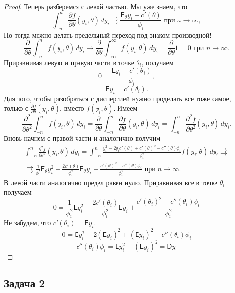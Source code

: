 \begin{proof}
  Теперь разберемся с левой частью. Мы уже знаем, что
  $$
    \int_{-n}^n\frac{\partial f}{\partial\theta}(y_i,\theta)\,dy_i \rightrightarrows \frac{\mathsf{E}_\theta y_i - c'(\theta)}{\phi_i} \text{ при } n\to\infty,
  $$
  Но тогда можно делать предельный переход под знаком производной!
  $$
    \frac{\partial}{\partial\theta} \int_{-n}^n f(y_i, \theta)\,dy_i \to \frac{\partial}{\partial\theta} \int_{-\infty}^\infty f(y_i, \theta)\,dy_i = \frac{\partial}{\partial\theta} 1 = 0 \text{ при } n\to\infty.
  $$
  Приравнивая левую и правую части в точке $\theta_i$, получаем
  $$
    0 = \frac{\mathsf{E}y_i - c'(\theta_i)}{\phi_i},
  $$
  $$
    \mathsf{E}y_i = c'(\theta_i).
  $$
  Для того, чтобы разобраться с дисперсией нужно проделать все тоже самое, только с $\frac{\partial f}{\partial\theta}(y_i, \theta)$, вместо $f(y_i, \theta)$. Имеем
  $$
    \frac{\partial^2}{\partial\theta^2} \int_{-n}^n f(y_i, \theta)\,dy_i =
    \frac{\partial}{\partial\theta} \int_{-n}^n\frac{\partial f}{\partial\theta}(y_i,\theta)\,dy_i = \int_{-n}^n\frac{\partial^2 f}{\partial\theta^2}(y_i,\theta)\,dy_i.
  $$
  Вновь начнем с правой части и аналогично получим
  \begin{multline*}
    \int_{-n}^n\frac{\partial^2 f}{\partial\theta^2}(y_i,\theta)\,dy_i =
    \int_{-n}^n \frac{y_i^2 - 2y_ic'(\theta) + c'(\theta)^2 - c''(\theta)\phi_i}{\phi_i^2} f(y_i,\theta)\,dy_i \rightrightarrows\\
    \rightrightarrows
    \frac{1}{\phi_i^2}\mathsf{E}_\theta y_i^2 -
    \frac{2c'(\theta)}{\phi_i^2}\mathsf{E}_\theta y_i +
    \frac{c'(\theta)^2 - c''(\theta)\phi_i}{\phi_i^2} \text{ при } n\to\infty.
  \end{multline*}
  В левой части аналогично предел равен нулю. Приравнивая все в точке $\theta_i$ получаем
  $$
    0 = \frac{1}{\phi_i^2}\mathsf{E} y_i^2 -
    \frac{2c'(\theta_i)}{\phi_i^2}\mathsf{E} y_i +
    \frac{c'(\theta_i)^2 - c''(\theta_i)\phi_i}{\phi_i^2}
  $$
  Не забудем, что $c'(\theta_i) = \mathsf{E} y_i$.
  $$
    0 = \mathsf{E} y_i^2 - 2\left(\mathsf{E} y_i\right)^2 + \left(\mathsf{E} y_i\right)^2 - c''(\theta_i)\phi_i
  $$
  $$
    c''(\theta_i)\phi_i = \mathsf{E} y_i^2 - \left(\mathsf{E} y_i\right)^2 = \mathsf{D}y_i
  $$
\end{proof}

\subsection*{Задача 2}

